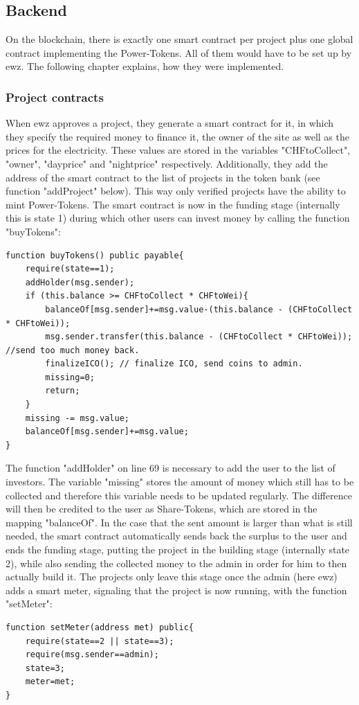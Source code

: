 \subsection{Backend}
On the blockchain, there is exactly one smart contract per project plus one global contract implementing the Power-Tokens. All of them would have to be set up by ewz. The following chapter explains, how they were implemented.

\subsubsection{Project contracts}
When ewz approves a project, they generate a smart contract for it, in which they specify the required money to finance it, the owner of the site as well as the prices for the electricity. These values are stored in the variables "CHFtoCollect", "owner", "dayprice" and "nightprice" respectively. Additionally, they add the address of the smart contract to the list of projects in the token bank (see function "addProject" below). This way only verified projects have the ability to mint Power-Tokens. The smart contract is now in the funding stage (internally this is state 1) during which other users can invest money by calling the function "buyTokens":

\begin{lstlisting}[language=Solidity, firstnumber=67]
function buyTokens() public payable{
    require(state==1);
    addHolder(msg.sender);
    if (this.balance >= CHFtoCollect * CHFtoWei){
        balanceOf[msg.sender]+=msg.value-(this.balance - (CHFtoCollect * CHFtoWei));
        msg.sender.transfer(this.balance - (CHFtoCollect * CHFtoWei)); //send too much money back.
        finalizeICO(); // finalize ICO, send coins to admin.
        missing=0;
        return;
    }
    missing -= msg.value;
    balanceOf[msg.sender]+=msg.value;
}
\end{lstlisting}

The function "addHolder" on line 69 is necessary to add the user to the list of investors. The variable "missing" stores the amount of money which still has to be collected and therefore this variable needs to be updated regularly. The difference will then be credited to the user as Share-Tokens, which are stored in the mapping "balanceOf". In the case that the sent amount is larger than what is still needed, the smart contract automatically sends back the surplus to the user and ends the funding stage, putting the project in the building stage (internally state 2), while also sending the collected money to the admin in order for him to then actually build it. The projects only leave this stage once the admin (here ewz) adds a smart meter, signaling that the project is now running, with the function "setMeter":
\begin{lstlisting}[language=Solidity, firstnumber=138]
function setMeter(address met) public{
    require(state==2 || state==3);
    require(msg.sender==admin);
    state=3;
    meter=met;
}
\end{lstlisting}

